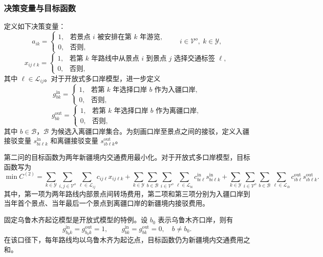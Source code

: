 \documentclass[UTF8,zihao=-4,a4paper]{ctexart}
\begin{document}
\subsubsection{决策变量与目标函数}
\label{subsubsec:q2_variables_objective}

定义如下决策变量：
\[
a_{ik}=
\begin{cases}
1, & \text{若景点 } i \text{ 被安排在第 } k \text{ 年游览},\\
0, & \text{否则},
\end{cases}
\qquad i\in\mathcal{V}^{o},\; k\in\mathcal{Y},
\]
\[
x_{ij\ell k}=
\begin{cases}
1, & \text{若第 } k \text{ 年路线中从景点 } i \text{ 到景点 } j \text{ 选择交通标签 } \ell,\\
0, & \text{否则},
\end{cases}
\]
其中 $\ell\in\mathcal{L}_{ij}$。对于开放式多口岸模型，进一步定义
\[
g_{bk}^{\mathrm{in}}=
\begin{cases}
1, & \text{若第 } k \text{ 年选择口岸 } b \text{ 作为入疆口岸},\\
0, & \text{否则},
\end{cases}
\]
\[
g_{bk}^{\mathrm{out}}=
\begin{cases}
1, & \text{若第 } k \text{ 年选择口岸 } b \text{ 作为离疆口岸},\\
0, & \text{否则},
\end{cases}
\]
其中 $b\in\mathcal{B}$，$\mathcal{B}$ 为候选入离疆口岸集合。为刻画口岸至景点之间的接驳，定义入疆接驳变量 $s_{bi\ell k}^{\mathrm{in}}$ 和离疆接驳变量 $s_{ib\ell k}^{\mathrm{out}}$。

第二问的目标函数为两年新疆境内交通费用最小化。对于开放式多口岸模型，目标函数写为
\[
\min C^{(2)}
=
\sum_{k\in\mathcal{Y}}
\sum_{i,j\in\mathcal{V}^{o}}
\sum_{\ell\in\mathcal{L}_{ij}}
c_{ij\ell}x_{ij\ell k}
+
\sum_{k\in\mathcal{Y}}
\sum_{b\in\mathcal{B}}
\sum_{i\in\mathcal{V}^{o}}
\sum_{\ell\in\mathcal{L}_{bi}}
c_{bi\ell}^{\mathrm{in}}s_{bi\ell k}^{\mathrm{in}}
+
\sum_{k\in\mathcal{Y}}
\sum_{i\in\mathcal{V}^{o}}
\sum_{b\in\mathcal{B}}
\sum_{\ell\in\mathcal{L}_{ib}}
c_{ib\ell}^{\mathrm{out}}s_{ib\ell k}^{\mathrm{out}}.
\]
其中，第一项为两年路线内部景点间转场费用，第二项和第三项分别为入疆口岸到当年首个景点、当年最后一个景点到离疆口岸的新疆境内接驳费用。

固定乌鲁木齐起讫模型是开放式模型的特例。设 $b_0$ 表示乌鲁木齐口岸，则有
\[
g_{b_0k}^{\mathrm{in}}=g_{b_0k}^{\mathrm{out}}=1,
\qquad
g_{bk}^{\mathrm{in}}=g_{bk}^{\mathrm{out}}=0,
\quad b\neq b_0.
\]
在该口径下，每年路线均以乌鲁木齐为起讫点，目标函数仍为新疆境内交通费用之和。
\end{document}
